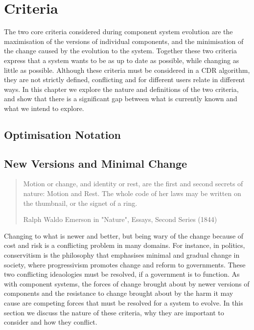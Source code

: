 \chapter{Criteria}
\label{criteria}
{}The two core criteria considered during component system evolution are the maximisation of the versions of individual components, 
{}and the minimisation of the change caused by the evolution to the system.
{}Together these two criteria express that a system wants to be as up to date as possible, while changing as little as possible.
{}Although these criteria must be considered in a CDR algorithm,
{}they are not strictly defined, conflicting and for different users relate in different ways.
{}In this chapter we explore the nature and definitions of the two criteria,
{}and show that there is a significant gap between what is currently known and what we intend to explore. 

\section{Optimisation Notation}



\section{New Versions and Minimal Change}
\begin{quotation}
Motion or change, and identity or rest, are the first and second secrets of nature: Motion and Rest. 
The whole code of her laws may be written on the thumbnail, or the signet of a ring.

Ralph Waldo Emerson in "Nature", Essays, Second Series (1844)
\end{quotation}

Changing to what is newer and better, but being wary of the change because of cost and risk is a conflicting problem in many domains.
For instance, in politics, conservitism is the philosophy that emphasises minimal and gradual change in society, %
where progressivism promotes change and reform to governments.
These two conflicting ideaologies must be resolved, if a government is to function. 
As with component systems, 
the forces of change brought about by newer versions of components and the resistance to change brought about by the harm it may cause
are competing forces that must be resolved for a system to evolve.
In this section we discuss the nature of these criteria, why they are important to consider and how they conflict.


